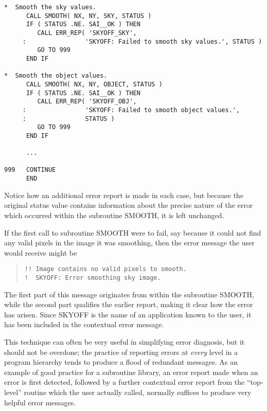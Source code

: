 \begin {small}
\begin{verbatim}
*  Smooth the sky values.
      CALL SMOOTH( NX, NY, SKY, STATUS )
      IF ( STATUS .NE. SAI__OK ) THEN
         CALL ERR_REP( 'SKYOFF_SKY',
     :                'SKYOFF: Failed to smooth sky values.', STATUS )
         GO TO 999
      END IF

*  Smooth the object values.
      CALL SMOOTH( NX, NY, OBJECT, STATUS )
      IF ( STATUS .NE. SAI__OK ) THEN
         CALL ERR_REP( 'SKYOFF_OBJ',
     :                'SKYOFF: Failed to smooth object values.', 
     :                STATUS )
         GO TO 999
      END IF

      ...

999   CONTINUE
      END
\end{verbatim}
\end {small}

Notice how an additional error report is made in each case, but because
the original status value contains information about the precise nature of 
the error which occurred within the subroutine SMOOTH, it is left unchanged. 

If the first call to subroutine SMOOTH were to fail, say because it could not 
find any valid pixels in the image it was smoothing, then the error message 
the user would receive might be 

\begin {quote}
\begin {small}
\begin{verbatim}
!! Image contains no valid pixels to smooth.
!  SKYOFF: Error smoothing sky image.
\end{verbatim}
\end {small}
\end {quote}

The first part of this message originates from within the subroutine SMOOTH, 
while the second part qualifies the earlier report, making it clear how the 
error has arisen.
Since SKYOFF is the name of an application known to the user, it has been 
included in the contextual error message.

This technique can often be very useful in simplifying error diagnosis, but
it should not be overdone; the practice of reporting errors at {\em every}
level in a program hierarchy tends to produce a flood of redundant messages.
As an example of good practice for a subroutine library, an error report made 
when an error is first detected, followed by a further contextual error report 
from the ``top-level'' routine which the user actually called, normally
suffices to produce very helpful error messages. 


